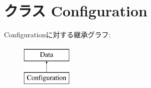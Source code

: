 \hypertarget{classm5_1_1util_1_1jobfile_1_1Configuration}{
\section{クラス Configuration}
\label{classm5_1_1util_1_1jobfile_1_1Configuration}
}
Configurationに対する継承グラフ:\begin{figure}[H]
\begin{center}
\leavevmode
\includegraphics[height=2cm]{classm5_1_1util_1_1jobfile_1_1Configuration}
\end{center}
\end{figure}

